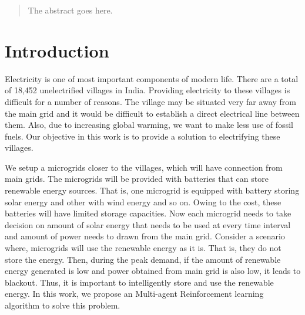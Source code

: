 \documentclass[conference]{IEEEtran}
\begin{document}




\maketitle

\begin{abstract}
The abstract goes here.
\end{abstract}





%
\IEEEpeerreviewmaketitle



\section{Introduction}

Electricity is one of most important components of modern life. There are a total of 18,452 unelectrified villages in India. Providing electricity to these villages is difficult for a number of reasons. The village may be situated very far away from the main grid and it would be difficult to establish a direct electrical line between them. Also, due to increasing global warming, we want to make less use of fossil fuels. Our objective in this work is to provide a solution to electrifying these villages.

We setup a microgrids closer to the villages, which will have connection from main grids. The microgrids will be provided with batteries that can store renewable energy sources. That is, one microgrid is equipped with battery storing solar energy and other with wind energy and so on. Owing to the cost, these batteries will have limited storage capacities. Now each microgrid needs to take decision on amount of solar energy that needs to be used at every time interval and amount of power needs to drawn from the main grid. Consider a scenario where, microgrids will use the renewable energy as it is. That is, they do not store the energy. Then, during the peak demand, if the amount of renewable energy generated is low and power obtained from main grid is also low, it leads to blackout. Thus, it is important to intelligently store and use the renewable energy. In this work, we propose an Multi-agent Reinforcement learning algorithm to solve this problem. 
\end{document}
